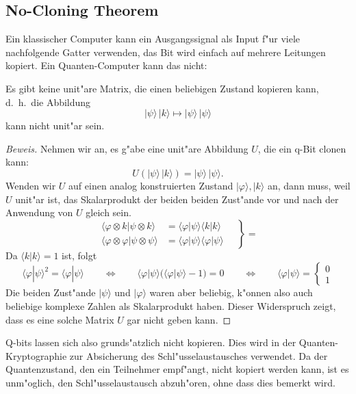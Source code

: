 \subsection{No-Cloning Theorem}
Ein klassischer Computer kann ein Ausgangssignal als Input f"ur viele
nachfolgende Gatter verwenden, das Bit wird einfach auf mehrere Leitungen
kopiert. 
Ein Quanten-Computer kann das nicht:
\begin{satz}
\label{skript:no-cloning-theorem}
Es gibt keine unit"are Matrix, die einen beliebigen Zustand kopieren
kann, d.~h.~die Abbildung
\[
|\psi\rangle\,|k\rangle\mapsto |\psi\rangle\,|\psi\rangle
\]
kann nicht unit"ar sein.
\end{satz}

\begin{proof}[Beweis]
Nehmen wir an, es g"abe eine unit"are Abbildung $U$, die ein q-Bit clonen
kann:
\[
U(|\psi\rangle\,|k\rangle)=|\psi\rangle\,|\psi\rangle.
\]
Wenden wir $U$ auf einen analog konstruierten Zustand
$|\varphi\rangle,|k\rangle$ an, dann muss, weil $U$ unit"ar ist,
das Skalarprodukt der beiden beiden Zust"ande vor und nach der Anwendung
von $U$ gleich sein.
\begin{equation}
\left.
\begin{aligned}
\langle\varphi\otimes k|\psi\otimes k\rangle
&=
\langle\varphi|\psi\rangle \langle k|k\rangle
\\
\langle\varphi\otimes\varphi|\psi\otimes\psi\rangle
&=
\langle\varphi|\psi\rangle \langle \varphi|\psi\rangle
\end{aligned}
\quad
\right\}=
\end{equation}
Da $\langle k|k\rangle=1$ ist, folgt
\[
\langle \varphi|\psi\rangle^2=
\langle \varphi|\psi\rangle
\qquad\Leftrightarrow\qquad
\langle \varphi|\psi\rangle ( \langle \varphi|\psi\rangle -1) = 0
\qquad\Leftrightarrow\qquad
\langle \varphi|\psi\rangle =\begin{cases}0\\1\end{cases}
\]
Die beiden Zust"ande $|\psi\rangle$ und $|\varphi\rangle$ waren aber
beliebig, k"onnen also auch beliebige komplexe Zahlen als Skalarprodukt
haben.
Dieser Widerspruch zeigt, dass es eine solche Matrix $U$ gar nicht
geben kann.
\end{proof}

Q-bits lassen sich also grunds"atzlich nicht kopieren.
Dies wird in der Quanten-Kryptographie zur Absicherung des
Schl"usselaustausches verwendet. 
Da der Quantenzustand, den ein Teilnehmer empf"angt, nicht kopiert
werden kann, ist es unm"oglich, den Schl"usselaustausch abzuh"oren,
ohne dass dies bemerkt wird.

